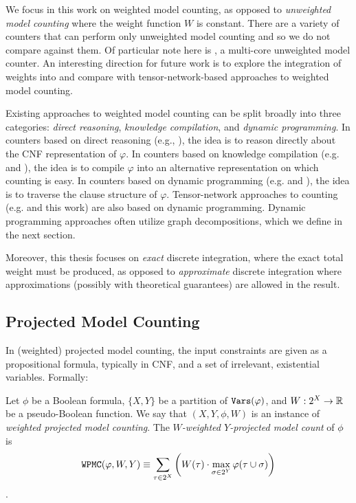 We focus in this work on weighted model counting, as opposed to \emph{unweighted model counting} where the weight function $W$ is constant. There are a variety of counters \cite{CW16,FHMW17,Thurley2006} that can perform only unweighted model counting and so we do not compare against them. Of particular note here is  \cite{BSB15}, a multi-core unweighted model counter. An interesting direction for future work is to explore the integration of weights into  and compare with tensor-network-based approaches to weighted model counting.

Existing approaches to weighted model counting can be split broadly into three categories: \emph{direct reasoning}, \emph{knowledge compilation}, and \emph{dynamic programming}. In counters based on direct reasoning (e.g.,  \cite{SBK05}), the idea is to reason directly about the CNF representation of $\varphi$. In counters based on knowledge compilation (e.g.  \cite{OD15} and  \cite{LM17}), the idea is to compile $\varphi$ into an alternative representation on which counting is easy. In counters based on dynamic programming (e.g.  \cite{DPV20} and  \cite{FHWZ18,FHZ19}), the idea is to traverse the clause structure of $\varphi$. Tensor-network approaches to counting (e.g.  \cite{DDV19} and this work) are also based on dynamic programming. Dynamic programming approaches often utilize graph decompositions, which we define in the next section. 

Moreover, this thesis focuses on \emph{exact} discrete integration, where the exact total weight must be produced, as opposed to \emph{approximate} discrete integration where approximations (possibly with theoretical guarantees) are allowed in the result. %

\subsection{Projected Model Counting}
In (weighted) projected model counting, the input constraints are given as a propositional formula, typically in CNF, and a set of irrelevant, existential variables.
Formally:
\begin{definition}
	Let $\phi$ be a Boolean formula, $\{X, Y\}$ be a partition of $\texttt{\upshape Vars}(\varphi)$, and $W: 2^X \to \mathbb{R}$ be a pseudo-Boolean function. We say that $(X, Y, \phi, W)$ is an instance of \emph{weighted projected model counting}.
	The \emph{$W$-weighted $Y$-projected model count} of $\phi$ is
	$$\texttt{\upshape WPMC}(\varphi, W, Y) \equiv \sum_{\tau \in 2^X} \left(  W(\tau) \cdot \max_{\sigma \in 2^Y} \varphi(\tau \cup \sigma)  \right)$$.
\end{definition}

